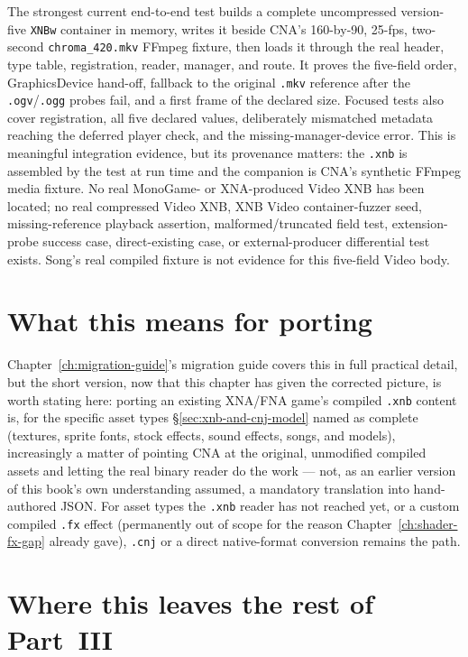 The strongest current end-to-end test builds a complete uncompressed version-five \texttt{XNBw}
container in memory, writes it beside CNA's 160-by-90, 25-fps, two-second
\texttt{chroma\_420.mkv} FFmpeg fixture, then loads it through the real header, type table,
registration, reader, manager, and  route.  It proves the five-field
order, GraphicsDevice hand-off, fallback to the original \texttt{.mkv} reference after the
\texttt{.ogv}/\texttt{.ogg} probes fail, and a first frame of the declared size.  Focused tests
also cover registration, all five declared values, deliberately mismatched metadata reaching
the deferred player check, and the missing-manager-device error.  This is meaningful integration
evidence, but its provenance matters: the \texttt{.xnb} is assembled by the test at run time and
the companion is CNA's synthetic FFmpeg media fixture.  No real MonoGame- or XNA-produced Video
XNB has been located; no real compressed Video XNB, XNB Video container-fuzzer seed,
missing-reference playback assertion, malformed/truncated field test, extension-probe success
case, direct-existing case, or external-producer differential test exists.  Song's real compiled
fixture is not evidence for this five-field Video body.

\section{What this means for porting}

Chapter~\ref{ch:migration-guide}'s migration guide covers this in full practical detail, but the
short version, now that this chapter has given the corrected picture, is worth stating here:
porting an existing XNA/FNA game's compiled \texttt{.xnb} content is, for the specific asset
types \S\ref{sec:xnb-and-cnj-model} named as complete (textures, sprite fonts, stock effects,
sound effects, songs, and models), increasingly a matter of pointing CNA at the original,
unmodified compiled assets and letting the real binary reader do the work --- not, as an
earlier version of this book's own understanding assumed, a mandatory translation into
hand-authored JSON. For asset types the \texttt{.xnb} reader has not reached yet, or a custom
compiled \texttt{.fx} effect (permanently out of scope for the reason
Chapter~\ref{ch:shader-fx-gap} already gave), \texttt{.cnj} or a direct native-format
conversion remains the path.

\section{Where this leaves the rest of Part~III}

